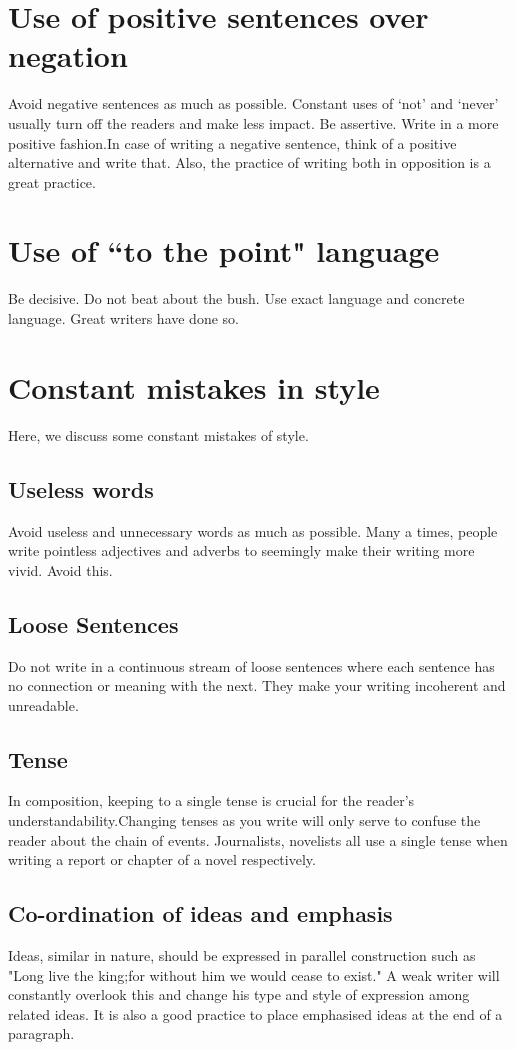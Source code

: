 \documentclass{report}
\begin{document}
\section{Use of positive sentences over negation}
Avoid negative sentences as much as possible. Constant uses of `not' and `never' usually turn off the readers and make less impact. Be assertive. Write in a more positive fashion.In case of writing a negative sentence, think of a positive alternative and write that. Also, the practice of writing both in opposition is a great practice.

\section{Use of ``to the point" language}
Be decisive. Do not beat about the bush. Use exact language and concrete language. Great writers have done so.

\section{Constant mistakes in style}
Here, we discuss some constant mistakes of style.
\subsection{Useless words}
Avoid useless and unnecessary words as much as possible. Many a times, people write pointless adjectives and adverbs to seemingly make their writing more vivid. Avoid this.
\subsection{Loose Sentences}
Do not write in a continuous stream of loose sentences where each sentence has no connection or meaning with the next. They make your writing incoherent and unreadable.
\subsection{Tense}
In composition, keeping to a single tense is crucial for the reader's understandability.Changing tenses as you write will only serve to confuse the reader about the chain of events. Journalists, novelists all use a single tense when writing a report or chapter of a novel respectively.
\subsection{Co-ordination of ideas and emphasis}
Ideas, similar in nature, should be expressed in parallel construction such as "Long live the king;for without him we would cease to exist." A weak writer will constantly overlook this and change his type and style of expression among related ideas. It is also a good practice to place emphasised ideas at the end of a paragraph.
\end{document}
